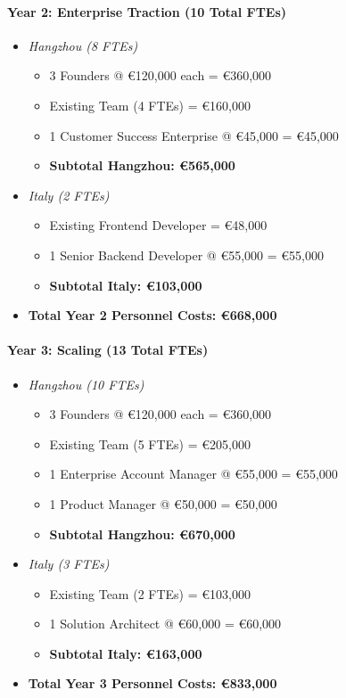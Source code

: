 \documentclass[11pt, a4paper, oneside]{article}
\begin{document}
\paragraph{Year 2: Enterprise Traction (10 Total FTEs)}
\begin{itemize}
    \item \textit{Hangzhou (8 FTEs)}
    \begin{itemize}
        \item 3 Founders @ \euro{120,000} each = \euro{360,000}
        \item Existing Team (4 FTEs) = \euro{160,000}
        \item 1 Customer Success Enterprise @ \euro{45,000} = \euro{45,000}
        \item \textbf{Subtotal Hangzhou: \euro{565,000}}
    \end{itemize}
    \item \textit{Italy (2 FTEs)}
    \begin{itemize}
        \item Existing Frontend Developer = \euro{48,000}
        \item 1 Senior Backend Developer @ \euro{55,000} = \euro{55,000}
        \item \textbf{Subtotal Italy: \euro{103,000}}
    \end{itemize}
    \item \textbf{Total Year 2 Personnel Costs: \euro{668,000}}
\end{itemize}

\paragraph{Year 3: Scaling (13 Total FTEs)}
\begin{itemize}
    \item \textit{Hangzhou (10 FTEs)}
    \begin{itemize}
        \item 3 Founders @ \euro{120,000} each = \euro{360,000}
        \item Existing Team (5 FTEs) = \euro{205,000}
        \item 1 Enterprise Account Manager @ \euro{55,000} = \euro{55,000}
        \item 1 Product Manager @ \euro{50,000} = \euro{50,000}
        \item \textbf{Subtotal Hangzhou: \euro{670,000}}
    \end{itemize}
    \item \textit{Italy (3 FTEs)}
    \begin{itemize}
        \item Existing Team (2 FTEs) = \euro{103,000}
        \item 1 Solution Architect @ \euro{60,000} = \euro{60,000}
        \item \textbf{Subtotal Italy: \euro{163,000}}
    \end{itemize}
    \item \textbf{Total Year 3 Personnel Costs: \euro{833,000}}
\end{itemize}
\end{document}
